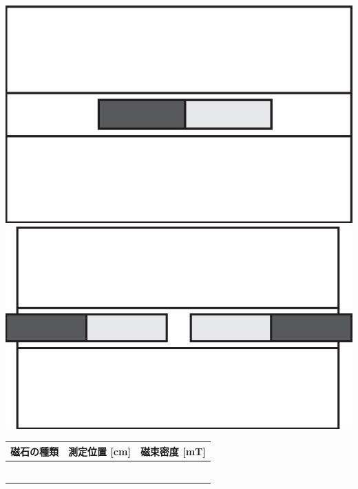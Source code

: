 \begin{center}
\vspace{1cm}
\includegraphics[scale=0.87]{06_Magnetism/magnet1.eps}
\hspace{1cm}
\includegraphics[scale=0.87]{06_Magnetism/magnet2.eps}
\end{center}

\newpage

%

\vspace{7cm}


\begin{center}
\begin{tabular}{|p{5cm}|p{3cm}|p{3cm}|}
\hline
磁石の種類 & 測定位置 [cm] &磁束密度 [mT]\\
\hline
&&\\
\hline
&&\\
\hline
&&\\
\hline
&&\\
\hline
&&\\
\hline
&&\\
\hline
\end{tabular}
\end{center}

